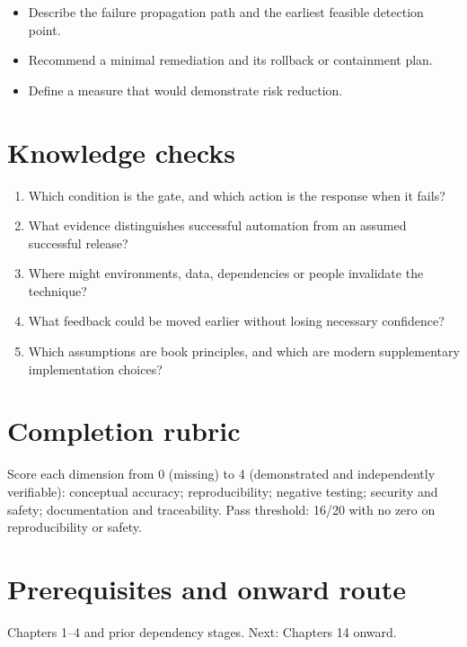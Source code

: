 \documentclass[10pt,letterpaper]{article}
\begin{document}
\begin{itemize}
\item Describe the failure propagation path and the earliest feasible detection point.
\item Recommend a minimal remediation and its rollback or containment plan.
\item Define a measure that would demonstrate risk reduction.
\end{itemize}

\section{Knowledge checks}
\begin{enumerate}
\item Which condition is the gate, and which action is the response when it fails?
\item What evidence distinguishes successful automation from an assumed successful release?
\item Where might environments, data, dependencies or people invalidate the technique?
\item What feedback could be moved earlier without losing necessary confidence?
\item Which assumptions are book principles, and which are modern supplementary implementation choices?
\end{enumerate}

\section{Completion rubric}
Score each dimension from 0 (missing) to 4 (demonstrated and independently verifiable): conceptual accuracy; reproducibility; negative testing; security and safety; documentation and traceability. Pass threshold: 16/20 with no zero on reproducibility or safety.


\section{Prerequisites and onward route}
Chapters 1--4 and prior dependency stages. Next: Chapters 14 onward.
\end{document}
